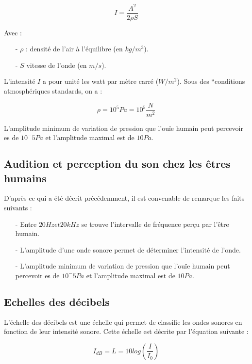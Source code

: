 \documentclass[conference,onecolumn]{IEEEtran}
\begin{document}
\[I = \dfrac{A^2}{2\rho S}\]

Avec :

\begin{itemize} %

    \item[-] $\rho$ : densité de l’air à l’équilibre (en $kg/m^3$).
    \item[-] $S$ vitesse de l’onde (en $m/s$).

\end{itemize}

L’intensité $I$ a pour unité les watt par mètre carré ($W/m^2$). Sous des “conditions atmosphériques standards, on a : 

\[\rho=10^5 Pa=10^5 \dfrac{N}{m^2}\]

L’amplitude minimum de variation de pression que l’ouïe humain peut percevoir es de $10^-5 Pa$ et l’amplitude maximal est de $10 Pa$. 

\subsection{Audition et perception du son chez les êtres humains}

D’après ce qui a été décrit précédemment, il est convenable de remarque les faits suivants :

\begin{itemize} %

    \item[-] Entre $20 Hz et 20 kHz$ se trouve l’intervalle de fréquence perçu par l’être humain.  

    \item[-] L’amplitude d’une onde sonore permet de déterminer l’intensité de l’onde. 

    \item[-] L’amplitude minimum de variation de pression que l’ouïe humain peut percevoir es de $10^-5 Pa$ et l’amplitude maximal est de $10 Pa$.

\end{itemize}

\subsection{Echelles des décibels}

L’échelle des décibels est une échelle qui permet de classifie les ondes sonores en fonction de leur intensité sonore. Cette échelle est décrite par l’équation suivante : 

\[I_{dB} = L = 10log(\dfrac{I}{I_0})\]
\end{document}
